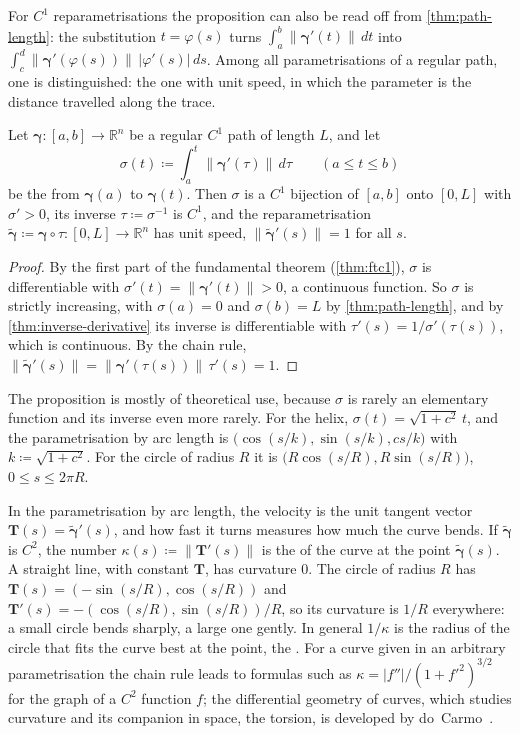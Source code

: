 For $C^1$ reparametrisations the proposition can also be read off from \cref{thm:path-length}: the substitution $t=\varphi(s)$ turns $\int_a^b\|\boldsymbol\gamma'(t)\|\,dt$ into $\int_c^d\|\boldsymbol\gamma'(\varphi(s))\|\,|\varphi'(s)|\,ds$. Among all parametrisations of a regular path, one is distinguished: the one with unit speed, in which the parameter is the distance travelled along the trace.

\begin{proposition}
\label{prop:arc-length-param}
Let $\boldsymbol\gamma\colon[a,b]\to\mathbb R^n$ be a regular $C^1$ path of length $L$, and let
\[
\sigma(t)\coloneqq\int_a^t\|\boldsymbol\gamma'(\tau)\|\,d\tau\qquad(a\le t\le b)
\]
be the  from $\boldsymbol\gamma(a)$ to $\boldsymbol\gamma(t)$. Then $\sigma$ is a $C^1$ bijection of $[a,b]$ onto $[0,L]$ with $\sigma'>0$, its inverse $\tau\coloneqq\sigma^{-1}$ is $C^1$, and the reparametrisation $\tilde{\boldsymbol\gamma}\coloneqq\boldsymbol\gamma\circ\tau\colon[0,L]\to\mathbb R^n$ has unit speed, $\|\tilde{\boldsymbol\gamma}'(s)\|=1$ for all $s$.
\end{proposition}

\begin{proof}
By the first part of the fundamental theorem (\cref{thm:ftc1}), $\sigma$ is differentiable with $\sigma'(t)=\|\boldsymbol\gamma'(t)\|>0$, a continuous function. So $\sigma$ is strictly increasing, with $\sigma(a)=0$ and $\sigma(b)=L$ by \cref{thm:path-length}, and by \cref{thm:inverse-derivative} its inverse is differentiable with $\tau'(s)=1/\sigma'(\tau(s))$, which is continuous. By the chain rule, $\|\tilde{\boldsymbol\gamma}'(s)\|=\|\boldsymbol\gamma'(\tau(s))\|\,\tau'(s)=1$.
\end{proof}

The proposition is mostly of theoretical use, because $\sigma$ is rarely an elementary function and its inverse even more rarely. For the helix, $\sigma(t)=\sqrt{1+c^2}\,t$, and the parametrisation by arc length is $\bigl(\cos(s/k),\sin(s/k),cs/k\bigr)$ with $k\coloneqq\sqrt{1+c^2}$. For the circle of radius $R$ it is $\bigl(R\cos(s/R),R\sin(s/R)\bigr)$, $0\le s\le2\pi R$.

In the parametrisation by arc length, the velocity is the unit tangent vector $\mathbf T(s)=\tilde{\boldsymbol\gamma}'(s)$, and how fast it turns measures how much the curve bends. If $\tilde{\boldsymbol\gamma}$ is $C^2$, the number $\kappa(s)\coloneqq\|\mathbf T'(s)\|$ is the  of the curve at the point $\tilde{\boldsymbol\gamma}(s)$. A straight line, with constant $\mathbf T$, has curvature $0$. The circle of radius $R$ has $\mathbf T(s)=(-\sin(s/R),\cos(s/R))$ and $\mathbf T'(s)=-(\cos(s/R),\sin(s/R))/R$, so its curvature is $1/R$ everywhere: a small circle bends sharply, a large one gently. In general $1/\kappa$ is the radius of the circle that fits the curve best at the point, the . For a curve given in an arbitrary parametrisation the chain rule leads to formulas such as $\kappa=|f''|/(1+f'^2)^{3/2}$ for the graph of a $C^2$ function $f$; the differential geometry of curves, which studies curvature and its companion in space, the torsion, is developed by do~Carmo~\cite{docarmo1976}.

